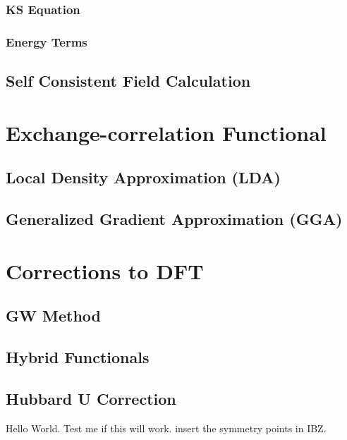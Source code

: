         \subsubsection{KS Equation}
        \subsubsection{Energy Terms}
    \subsection{Self Consistent Field Calculation}
\section{Exchange-correlation Functional}
    \subsection{Local Density Approximation (LDA)}
    \subsection{Generalized Gradient Approximation (GGA)}

\section{Corrections to DFT}
    \subsection{GW Method}
    \subsection{Hybrid Functionals}
    \subsection{Hubbard U Correction}
 Hello World. Test me if this will work.
    {\color{red} insert the symmetry points in IBZ.}


